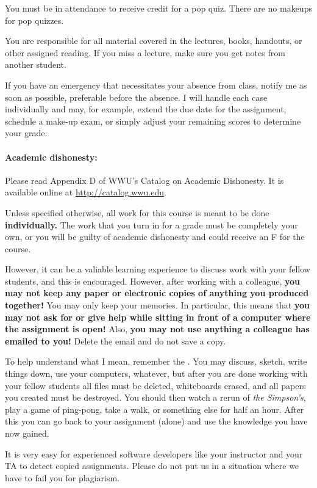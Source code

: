 \documentclass{article}
\begin{document}
  You must be in attendance to receive credit for a pop quiz.  There
  are no makeups for pop quizzes.

  You are responsible for all material covered in the lectures, books,
  handouts, or other assigned reading.  If you miss a lecture,
  make sure you get notes from another student.

  If you have an emergency that necessitates your absence from class,
  notify me as soon as possible, preferable before the absence.  I
  will handle each case individually and may, for example, extend the
  due date for the assignment, schedule a make-up exam, or simply
  adjust your remaining scores to determine your grade.

\paragraph{Academic dishonesty:} Please read Appendix D of WWU's Catalog on
  Academic Dishonesty.  It is available online at
  \url{http://catalog.wwu.edu}.

  Unless specified otherwise, all work for this course is meant to
  be done {\bf individually.}  The work that you turn in for a grade
  must be completely your own, or you will be guilty of academic
  dishonesty and could receive an F for the course.

  However, it can be a valiable learning experience to discuss
  work with your fellow students, and this is encouraged.
  However, after working with a colleague, {\bf you may not keep any
    paper or electronic copies of anything you produced together!}
  You may only keep your memories.  In particular, this means that
  {\bf you may not ask for or give help while sitting in front of a
    computer where the assignment is open!}  Also, {\bf you may not
    use anything a colleague has emailed to you!}  Delete the email
  and do not save a copy.

  To help understand what I mean, remember the .  You may discuss, sketch, write things down, use
  your computers, whatever, but after you are done working with your
  fellow students all files must be deleted, whiteboards erased, and
  all papers you created must be destroyed.  You should then watch a
  rerun of {\em the Simpson's}, play a game of ping-pong, take a walk,
  or something else for half an hour. After this you can go back to
  your assignment (alone) and use the knowledge you have now gained.

  It is very easy for experienced software developers like your
  instructor and your TA to detect copied assignments.  Please do not
  put us in a situation where we have to fail you for plagiarism.
\end{document}
